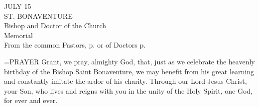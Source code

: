 \begin{center}\normalsize JULY 15\\
\footnotesize ST. BONAVENTURE\\
\footnotesize Bishop and Doctor of the Church\\
\footnotesize Memorial\\
\footnotesize From the common Pastors, p.     or of Doctors p. \\
\end{center}

\hangindent=\parindent \small{PRAYER 
Grant, we pray, almighty God,
that, just as we celebrate the heavenly birthday
of the Bishop Saint Bonaventure,
we may benefit from his great learning
and constantly imitate the ardor of his charity.
Through our Lord Jesus Christ, your Son,
who lives and reigns with you in the unity of the Holy Spirit,
one God, for ever and ever.\\}
 

